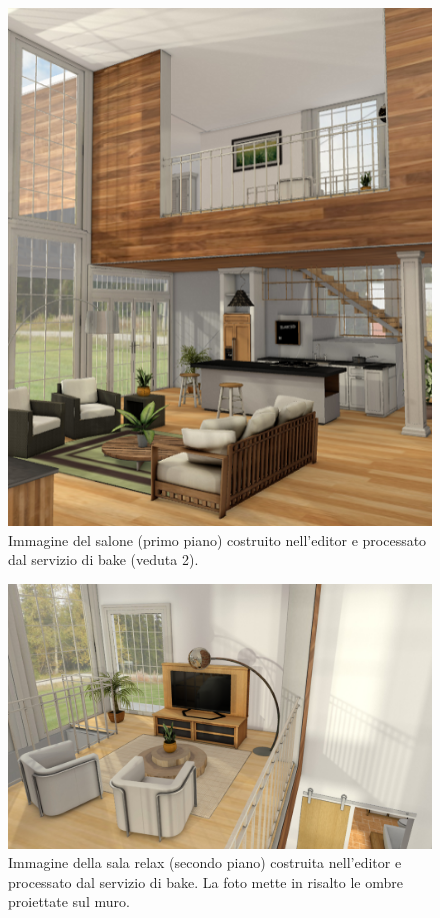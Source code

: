 \begin{figure}[htb]
 \centering
 \includegraphics[width=1\linewidth]{images/chapter_prove_sperimentali/scena2_bake.png}\hfill
 \caption[Ambiente virtuale: Salone primo piano, veduta 2]{Immagine del salone (primo piano) costruito nell'editor e processato dal servizio di bake (veduta 2).}
 \label{fig:prove_sperimentali_qualita_visiva_scena2_bake}
\end{figure}
\begin{figure}[htb]
 \centering
 \includegraphics[width=1\linewidth]{images/chapter_prove_sperimentali/scena_1_pianosup_hobby.png}\hfill
 \caption[Ambiente virtuale: Sala relax secondo piano, veduta 1]{Immagine della sala relax (secondo piano) costruita nell'editor e processato dal servizio di bake. La foto mette in risalto le ombre proiettate sul muro.}
 \label{fig:prove_sperimentali_qualita_visiva_scena_hobby1}
\end{figure}
